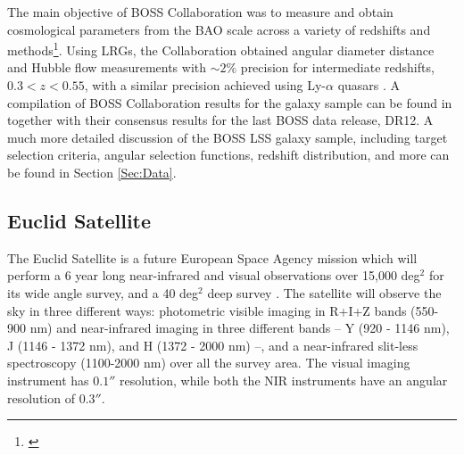 \qquad The main objective of BOSS Collaboration was to measure and obtain cosmological parameters from the BAO scale across a variety of redshifts and methods\footnote{\citep{2017RossBOSS,2017BeutlerBOSS,2017Beutler2BOSS,2017SatpathyBOSS,2017SanchezBOSS,2017GriebBOSS,2017SalazarBOSSwTheta,2017WangBOSS,2017ZhaoBOSS}}. Using LRGs, the Collaboration obtained angular diameter distance and Hubble flow measurements with $\sim 2\%$ precision for intermediate redshifts, $0.3 < z < 0.55$, with a similar precision achieved using Ly-$\alpha$ quasars \citep{2013LyAlphaBOSS}. A compilation of BOSS Collaboration results for the galaxy sample can be found in \cite{2016BOSSCosmology} together with their consensus results for the last BOSS data release, DR12. A much more detailed discussion of the BOSS LSS galaxy sample, including target selection criteria, angular selection functions, redshift distribution, and more can be found in Section \ref{Sec:Data}.



\subsection{Euclid Satellite}
The Euclid Satellite is a future European Space Agency mission which will perform a 6 year long near-infrared and visual observations over 15,000 deg$^2$ for its wide angle survey, and a 40 deg$^2$ deep survey \citep{2011EuclidRedPaper}. The satellite will observe the sky in three different ways: photometric visible imaging in R+I+Z bands (550-900 nm) and near-infrared imaging in three different bands -- Y (920 - 1146 nm), J (1146 - 1372 nm), and H (1372 - 2000 nm) --, and a near-infrared slit-less spectroscopy (1100-2000 nm) over all the survey area. The visual imaging instrument has $0.1 ''$ resolution, while both the NIR instruments have an angular resolution of $0.3''$.

